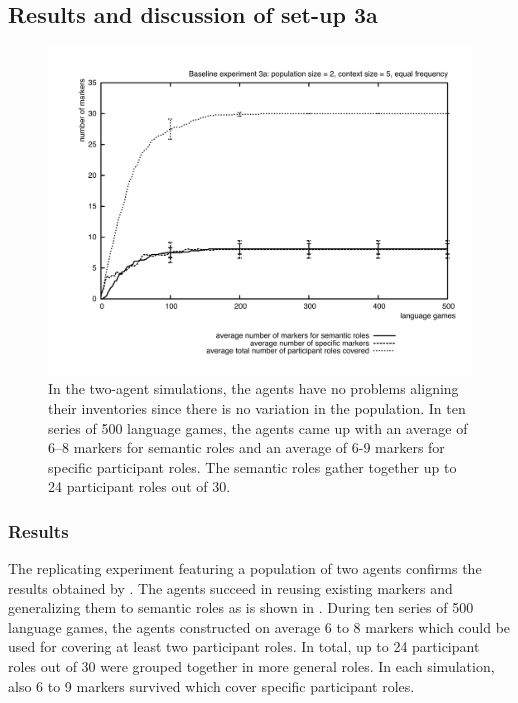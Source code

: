 \subsection{Results and discussion of set-up 3a}

\begin{figure}[b]
\centerline{\includegraphics[width=\textwidth]{Chapter3/figs/graph-base3-size3a}}
  \caption[Baseline experiment 3a: number of markers]{In the two-agent simulations, the agents have no problems aligning their inventories since there is no variation in the population. In ten series of 500 language games, the agents came up with an average of 6--8 markers for semantic roles and an average of 6-9 markers for specific participant roles. The semantic roles gather together up to 24 participant roles out of 30.}
   \label{f:base3-size3a}
\end{figure}

\largerpage
\subsubsection{Results}
 The replicating experiment featuring a population of two agents confirms the results obtained by \citet{steels02simulating, steels04constructivist}. The agents succeed in reusing existing markers and generalizing them to semantic roles as is shown in  . During ten series of 500 language games, the agents constructed on average 6 to 8 markers which could be used for covering at least two participant roles. In total, up to 24 participant roles out of 30 were grouped together in more general roles. In each simulation, also 6 to 9 markers survived which cover specific participant roles.

